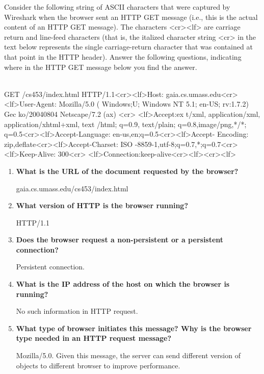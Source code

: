 \documentclass[11pt]{article}
\newenvironment{qparts}{\begin{enumerate}[{(}a{)}]}{\end{enumerate}}
\begin{document}
Consider the following string of ASCII characters that were captured by Wireshark when the browser sent an HTTP GET message (i.e., this is the actual content of an HTTP GET message). The characters <cr><lf> are carriage return and line-feed characters (that is, the italized character string <cr> in the text below represents the single carriage-return character that was contained at that point in the HTTP header). Answer the following questions, indicating where in the HTTP GET message below you find the answer.

~\\

GET /cs453/index.html HTTP/1.1<cr><lf>Host: gaia.cs.umass.edu<cr><lf>User-Agent: Mozilla/5.0 ( Windows;U; Windows NT 5.1; en-US; rv:1.7.2) Gec ko/20040804 Netscape/7.2 (ax) <cr> <lf>Accept:ex t/xml, application/xml, application/xhtml+xml, text /html; q=0.9, text/plain; q=0.8,image/png,*/*; q=0.5<cr><lf>Accept-Language: en-us,en;q=0.5<cr><lf>Accept- Encoding: zip,deflate<cr><lf>Accept-Charset: ISO -8859-1,utf-8;q=0.7,*;q=0.7<cr><lf>Keep-Alive: 300<cr> <lf>Connection:keep-alive<cr><lf><cr><lf>

\begin{qparts}
	\item \textbf{What is the URL of the document requested by the browser?}
	
	gaia.cs.umass.edu/cs453/index.html
	

	\item  \textbf{What version of HTTP is the browser running?}

	HTTP/1.1
	
	\item  \textbf{Does the browser request a non-persistent or a persistent connection?}
	
	Persistent connection.
	
	\item  \textbf{What is the IP address of the host on which the browser is running?}
	
	No such information in HTTP request.
	
	\item  \textbf{What type of browser initiates this message? Why is the browser type needed in an HTTP request message?}
	
	Mozilla/5.0. Given this message, the server can send different version of objects to different browser to improve performance.
	

\end{qparts}
\end{document}
